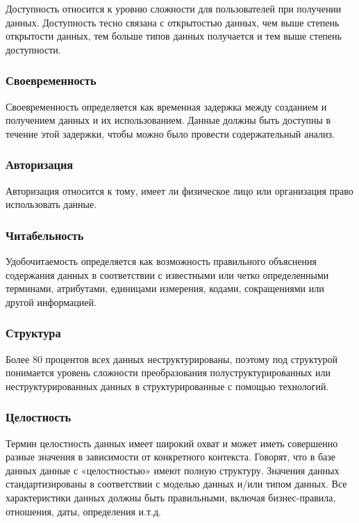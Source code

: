 \documentclass{article}
\begin{document}
Доступность относится к уровню сложности для пользователей при получении данных. Доступность тесно связана с открытостью данных, чем выше степень открытости данных, тем больше типов данных получается и тем выше степень доступности.

\subsubsection{Своевременность}

Своевременность определяется как временная задержка между созданием и получением данных и их использованием. Данные должны быть доступны в течение этой задержки, чтобы можно было провести содержательный анализ.

\subsubsection{Авторизация}

Авторизация относится к тому, имеет ли физическое лицо или организация право использовать данные.

\subsubsection{Читабельность}

Удобочитаемость определяется как возможность правильного объяснения содержания данных в соответствии с известными или четко определенными терминами, атрибутами, единицами измерения, кодами, сокращениями или другой информацией.

\subsubsection{Структура}

Более 80 процентов всех данных неструктурированы, поэтому под структурой понимается уровень сложности преобразования полуструктурированных или неструктурированных данных в структурированные с помощью технологий.

\subsubsection{Целостность}

Термин целостность данных имеет широкий охват и может иметь совершенно разные значения в зависимости от конкретного контекста. Говорят, что в базе данных данные с «целостностью» имеют полную структуру. Значения данных стандартизированы в соответствии с моделью данных и/или типом данных. Все характеристики данных должны быть правильными, включая бизнес-правила, отношения, даты, определения и.т.д.
\end{document}
